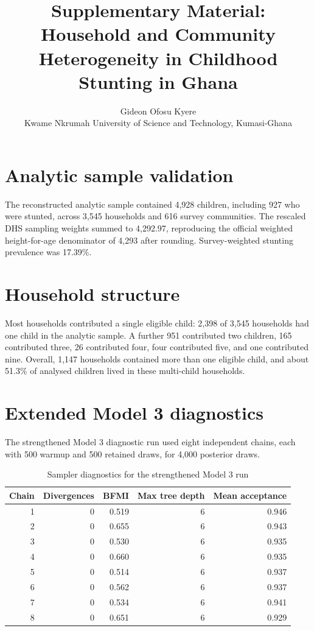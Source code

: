 \documentclass[10pt]{article}
\title{Supplementary Material: Household and Community Heterogeneity in Childhood Stunting in Ghana}
\author{Gideon Ofosu Kyere\\\small Kwame Nkrumah University of Science and Technology, Kumasi-Ghana}
\date{}
\begin{document}
\maketitle

\section{Analytic sample validation}

The reconstructed analytic sample contained 4,928 children, including 927 who were stunted, across 3,545 households and 616 survey communities. The rescaled DHS sampling weights summed to 4,292.97, reproducing the official weighted height-for-age denominator of 4,293 after rounding. Survey-weighted stunting prevalence was 17.39\%.

\section{Household structure}

Most households contributed a single eligible child: 2,398 of 3,545 households had one child in the analytic sample. A further 951 contributed two children, 165 contributed three, 26 contributed four, four contributed five, and one contributed nine. Overall, 1,147 households contained more than one eligible child, and about 51.3\% of analysed children lived in these multi-child households.

\section{Extended Model 3 diagnostics}

The strengthened Model 3 diagnostic run used eight independent chains, each with 500 warmup and 500 retained draws, for 4,000 posterior draws.

\begin{table}[H]
\centering
\caption{Sampler diagnostics for the strengthened Model 3 run}
\begin{tabular}{rrrrr}
\toprule
Chain & Divergences & BFMI & Max tree depth & Mean acceptance \\
\midrule
1 & 0 & 0.519 & 6 & 0.946 \\
2 & 0 & 0.655 & 6 & 0.943 \\
3 & 0 & 0.530 & 6 & 0.935 \\
4 & 0 & 0.660 & 6 & 0.935 \\
5 & 0 & 0.514 & 6 & 0.937 \\
6 & 0 & 0.562 & 6 & 0.937 \\
7 & 0 & 0.534 & 6 & 0.941 \\
8 & 0 & 0.651 & 6 & 0.929 \\
\bottomrule
\end{tabular}
\end{table}
\end{document}
